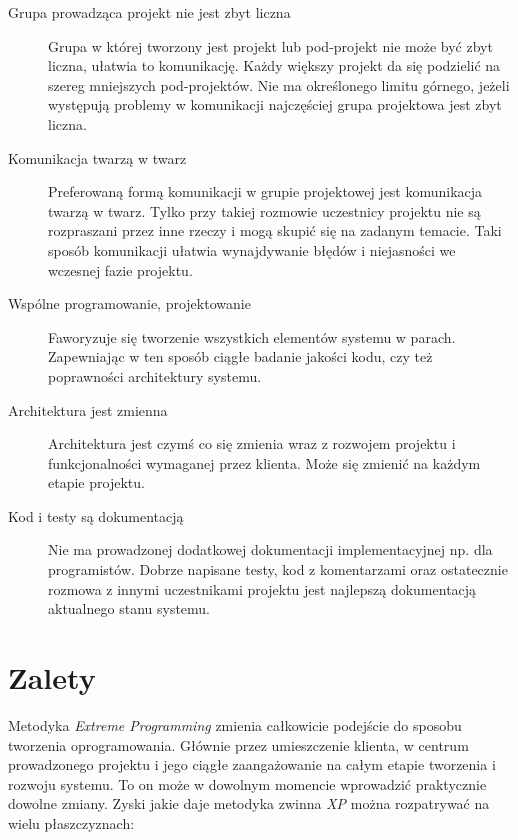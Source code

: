 \begin{description}
    \item[Grupa prowadząca projekt nie jest zbyt liczna] Grupa w której tworzony jest projekt lub pod-projekt nie może być zbyt liczna, ułatwia to komunikację. Każdy większy projekt da się podzielić na szereg mniejszych pod-projektów. Nie ma określonego limitu górnego, jeżeli występują problemy w komunikacji najczęściej grupa projektowa jest zbyt liczna.
    \item[Komunikacja twarzą w twarz] Preferowaną formą komunikacji w grupie projektowej jest komunikacja twarzą w twarz. Tylko przy takiej rozmowie uczestnicy projektu nie są rozpraszani przez inne rzeczy i mogą skupić się na zadanym temacie. Taki sposób komunikacji ułatwia wynajdywanie błędów i niejasności we wczesnej fazie projektu.
    \item[Wspólne programowanie, projektowanie] Faworyzuje się tworzenie wszystkich elementów systemu w parach. Zapewniając w ten sposób ciągłe badanie jakości kodu, czy też poprawności architektury systemu.
    \item[Architektura jest zmienna] Architektura jest czymś co się zmienia wraz z rozwojem projektu i funkcjonalności wymaganej przez klienta. Może się zmienić na każdym etapie projektu.
    \item[Kod i testy są dokumentacją] Nie ma prowadzonej dodatkowej dokumentacji implementacyjnej np. dla programistów. Dobrze napisane testy, kod z komentarzami oraz ostatecznie rozmowa z innymi uczestnikami projektu jest najlepszą dokumentacją aktualnego stanu systemu.
\end{description}

\section{Zalety}
\label{sec:ZMTOzalety}

Metodyka \textit{Extreme Programming} zmienia całkowicie podejście do sposobu tworzenia oprogramowania. Głównie przez umieszczenie klienta, w centrum prowadzonego projektu i jego ciągłe zaangażowanie na całym etapie tworzenia i rozwoju systemu. To on może w dowolnym momencie wprowadzić praktycznie dowolne zmiany. Zyski jakie daje metodyka zwinna \textit{XP} można rozpatrywać na wielu płaszczyznach:

